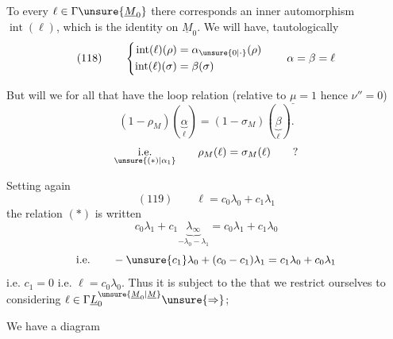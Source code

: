 To every $\ell\in\Gamma\unsure{\underline M_0}$ there corresponds an inner automorphism $\operatorname{int}(\ell)$, which is the identity on $\underline M_0$. We will have, tautologically
\[
(118)\qquad
\left\{\begin{aligned}
\operatorname{int}(\ell)(\rho)&=\alpha_{\unsure{0|\cdot}}(\rho)\\
\operatorname{int}(\ell)(\sigma)&=\beta(\sigma)
\end{aligned}\right.
\qquad\alpha=\beta=\ell
\]

But  will we for all that have the loop relation (relative to $\underline\mu=1$ hence $\nu''=0$)
\[
(1-\rho_M)(\underbrace{\alpha}_{\ell})=(1-\sigma_M)(\underbrace{\beta}_{\ell}).
\]
\[
\underset{\unsure{(*)|\alpha_1}}{\text{i.e.}}\qquad
\rho_M(\ell)=\sigma_M(\ell)\qquad ?
\]

Setting again
\[
(119)\qquad\ell=c_0\lambda_0+c_1\lambda_1
\]
the relation $(*)$ is written
\[
c_0\lambda_1+c_1\underbrace{\lambda_\infty}_{-\lambda_0-\lambda_1}
=c_0\lambda_1+c_1\lambda_0
\]
\[
\text{i.e.}\qquad-\unsure{c_1}\lambda_0+(c_0-c_1)\lambda_1
=c_1\lambda_0+c_0\lambda_1
\]
i.e. $c_1=0$ i.e. $\ell=c_0\lambda_0$. Thus it is subject to the  that we restrict ourselves to considering $\ell\in\Gamma\underline L_0^{\unsure{\underline M_0|\underline M}}\unsure{\Rightarrow}$; 


We have a  diagram


